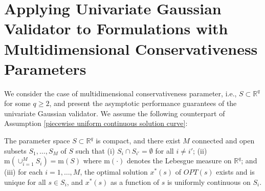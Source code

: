 \documentclass[mnsc,blindrev]{informs4} %
\newcommand{\R}{\mathbb{R}}
\begin{document}
\section{Applying Univariate Gaussian Validator to Formulations with Multidimensional Conservativeness Parameters}\label{sec:multidimensional parameter univariate gaussian}
We consider the case of multidimensional conservativeness parameter, i.e., $S\subset \R^q$ for some $q\geq 2$, and present the asymptotic performance guarantees of the univariate Gaussian validator. We assume the following counterpart of Assumption \ref{piecewise uniform continuous solution curve}:
\begin{assumption}\label{piecewise uniform continuous solution curve:multivariate}
The parameter space $S\subset \R^q$ is compact, and there exist $M$ connected and open subsets $S_1,\ldots,S_M$ of $S$ such that (i) $S_i\cap S_{i'}=\emptyset$ for all $i\neq i'$; (ii) $\mathrm{m}(\cup_{i=1}^MS_i)=\mathrm{m}(S)$ where $\mathrm{m}(\cdot)$ denotes the Lebesgue measure on $\R^q$; and (iii) for each $i=1,\ldots,M$, the optimal solution $x^*(s)$ of $OPT(s)$ exists and is unique for all $s\in S_i$, and $x^*(s)$ as a function of $s$ is uniformly continuous on $S_i$.
\end{assumption}
\end{document}
